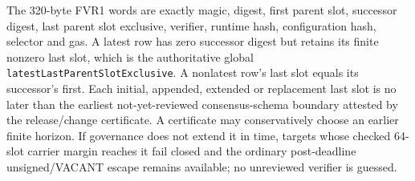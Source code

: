 \documentclass[a4paper,11pt]{article}
\newcommand{\code}[1]{\nolinkurl{#1}}
\begin{document}
The 320-byte FVR1 words are exactly magic, digest, first parent slot,
successor digest, last parent slot exclusive, verifier, runtime hash,
configuration hash, selector and gas.  A latest row has zero successor digest
but retains its finite nonzero last slot, which is the authoritative global
\code{latestLastParentSlotExclusive}.  A nonlatest row's last slot equals its
successor's first.  Each initial, appended, extended or replacement last slot
is no later
than the earliest not-yet-reviewed consensus-schema boundary attested by the
release/change certificate.  A certificate may conservatively choose an
earlier finite horizon.  If governance does not extend it in time, targets
whose checked 64-slot carrier margin reaches it fail closed and the ordinary
post-deadline unsigned/VACANT escape
remains available; no unreviewed verifier is guessed.
\end{document}
